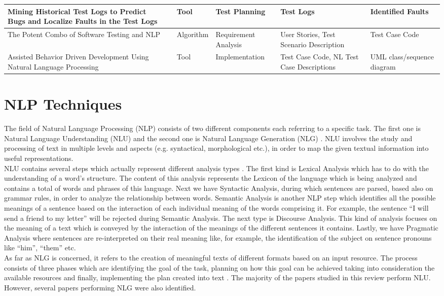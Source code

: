\begin{longtable}{|p{3cm}|p{1cm}|p{2.5cm}|p{2.8cm}|p{2.5cm}|p{2.5cm}|}
            \hline Mining Historical Test Logs to Predict Bugs and Localize Faults in the Test Logs & \cite{8812113} & Tool& Test Planning & Test Logs & Identified Faults\\
            \hline The Potent Combo of Software Testing and NLP & \cite{mulla2020potent} & Algorithm& Requirement Analysis& User Stories, Test Scenario Description & Test Case Code\\
            \hline Assisted Behavior Driven Development Using Natural Language Processing & \cite{soeken2012assisted} & Tool& Implementation & Test Case Code, NL Test Case Descriptions & UML class/sequence diagram\\
        \hline
\end{longtable}

\section{NLP Techniques}
The field of Natural Language Processing (NLP) consists of two different components each referring to a specific task. The first one is Natural Language Understanding (NLU) and the second one is Natural Language 
Generation (NLG) \cite{liddy2001natural, khurana2017natural}. NLU involves the study and processing of text in multiple levels and aspects (e.g. syntactical, morphological etc.), in order to map the given textual 
information into useful representations. \\
NLU contains several steps which actually represent different analysis types \cite{liddy2001natural}. The first kind is Lexical Analysis which has to do with the understanding of a word's structure. 
The content of this analysis represents the Lexicon of the language which is being analyzed and contains a total of words and phrases of this language. Next we have Syntactic Analysis, during which sentences are parsed, 
based also on grammar rules, in order to analyze the relationship between words. Semantic Analysis is another NLP 
step which identifies all the possible meanings of a sentence based on the interaction of each individual meaning of the words comprising it.  For example, the sentence ``I will send a friend to my letter'' will be rejected 
during Semantic Analysis. The next type is Discourse Analysis. This kind of analysis focuses on the meaning of a text which is conveyed by the interaction of the meanings of the different sentences it contains. Lastly, we have 
Pragmatic Analysis where sentences are re-interpreted on their real meaning like, for example, the identification of the subject on sentence pronouns like ``him'', ``them'' etc.\\ As far as NLG is concerned, 
it refers to the creation of meaningful texts of different formats based on an input resource. The process consists of three phases which are identifying the goal of the task, planning on how this goal can 
be achieved taking into consideration the available resources and finally, implementing the plan created into text \cite{khurana2017natural}. The majority of the papers studied in this review perform NLU. 
However, several papers performing NLG were also identified.

